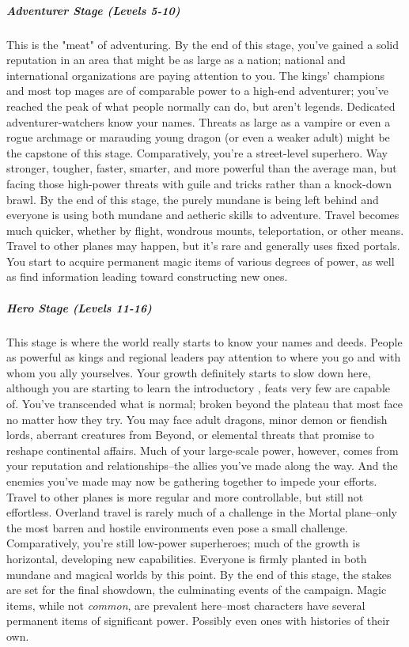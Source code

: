 \subparagraph*{Adventurer Stage (Levels 5-10)}
This is the "meat" of adventuring. By the end of this stage, you've gained a solid reputation in an area that might be as large as a nation; national and international organizations are paying attention to you. The kings' champions and most top mages are of comparable power to a high-end adventurer; you've reached the peak of what people normally can do, but aren't legends. Dedicated adventurer-watchers know your names. Threats as large as a vampire or even a rogue archmage or marauding young dragon (or even a weaker adult) might be the capstone of this stage. Comparatively, you're a street-level superhero. Way stronger, tougher, faster, smarter, and more powerful than the average man, but facing those high-power threats with guile and tricks rather than a knock-down brawl. By the end of this stage, the purely mundane is being left behind and everyone is using both mundane and aetheric skills to adventure. Travel becomes much quicker, whether by flight, wondrous mounts, teleportation, or other means. Travel to other planes may happen, but it's rare and generally uses fixed portals. You start to acquire permanent magic items of various degrees of power, as well as find information leading toward constructing new ones. 

\subparagraph*{Hero Stage (Levels 11-16)}
This stage is where the world really starts to know your names and deeds. People as powerful as kings and regional leaders pay attention to where you go and with whom you ally yourselves. Your growth definitely starts to slow down here, although you are starting to learn the introductory , feats very few are capable of. You've transcended what is normal; broken beyond the plateau that most face no matter how they try. You may face adult dragons, minor demon or fiendish lords, aberrant creatures from Beyond, or elemental threats that promise to reshape continental affairs. Much of your large-scale power, however, comes from your reputation and relationships--the allies you've made along the way. And the enemies you've made may now be gathering together to impede your efforts. Travel to other planes is more regular and more controllable, but still not effortless. Overland travel is rarely much of a challenge in the Mortal plane--only the most barren and hostile environments even pose a small challenge. Comparatively, you're still low-power superheroes; much of the growth is horizontal, developing new capabilities. Everyone is firmly planted in both mundane and magical worlds by this point. By the end of this stage, the stakes are set for the final showdown, the culminating events of the campaign. Magic items, while not \textit{common}, are prevalent here--most characters have several permanent items of significant power. Possibly even ones with histories of their own.

